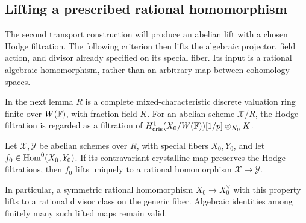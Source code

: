 \subsection{Lifting a prescribed rational homomorphism}

The second transport construction will produce an abelian lift with a
chosen Hodge filtration. The following criterion then lifts the algebraic
projector, field action, and divisor already specified on its special fiber.
Its input is a rational algebraic homomorphism, rather than an arbitrary
map between cohomology spaces.

In the next lemma \(R\) is a complete mixed-characteristic discrete
valuation ring finite over \(W(\mathbb F)\), with fraction field \(K\).
For an abelian scheme \(\mathcal X/R\), the Hodge filtration is regarded
as a filtration of
\(H^1_{\mathrm{cris}}(X_0/W(\mathbb F))[1/p]\otimes_{K_0}K\).

\begin{lemma}\label{lem:lift-hom}
Let \(\mathcal X,\mathcal Y\) be abelian schemes over \(R\), with
special fibers \(X_0,Y_0\), and let
\(f_0\in\operatorname{Hom}^0(X_0,Y_0)\). If its contravariant crystalline map
preserves the Hodge filtrations, then \(f_0\) lifts uniquely to a
rational homomorphism \(\mathcal X\to\mathcal Y\).

In particular, a symmetric rational homomorphism \(X_0\to X_0^\vee\)
with this property lifts to a rational divisor class on the generic
fiber. Algebraic identities among finitely many such lifted maps remain
valid.
\end{lemma}

